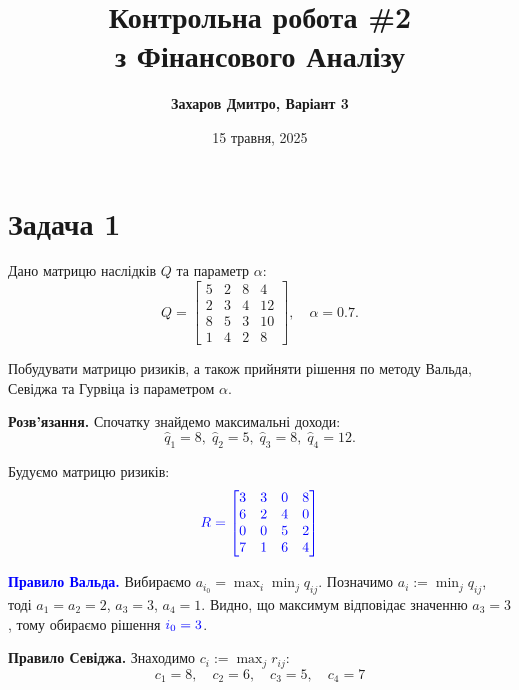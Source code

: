 \documentclass{test_template}
\title{\bfseries Контрольна робота \#2 \\з Фінансового Аналізу}
\author{\bfseries Захаров Дмитро, Варіант 3}
\date{15 травня, 2025}
\begin{document}
\pagestyle{fancy}

\maketitle

\section{Задача 1}

\begin{problem}
    Дано матрицю наслідків $Q$ та параметр $\alpha$:
    \begin{equation*}
        Q = \begin{bmatrix}
            5 & 2 & 8 & 4 \\
            2 & 3 & 4 & 12 \\ 
            8 & 5 & 3 & 10 \\
            1 & 4 & 2 & 8
        \end{bmatrix}, \quad \alpha=0.7.
    \end{equation*}

    Побудувати матрицю ризиків, а також прийняти рішення по методу Вальда,
    Севіджа та Гурвіца із параметром $\alpha$. 
\end{problem}

\textbf{Розв'язання.} Спочатку знайдемо максимальні доходи:
\begin{equation*}
    \hat{q}_1 = 8, \; \hat{q}_2 = 5, \; \hat{q}_3 = 8, \; \hat{q}_4 = 12.
\end{equation*}

Будуємо матрицю ризиків:
\begin{equation*}
    \textcolor{blue}{R = \begin{bmatrix}
        3 & 3 & 0 & 8 \\
        6 & 2 & 4 & 0 \\
        0 & 0 & 5 & 2 \\
        7 & 1 & 6 & 4
    \end{bmatrix}}
\end{equation*}

\textcolor{blue}{\textbf{Правило Вальда.}} Вибираємо $a_{i_0} = \max_i\min_j q_{ij}$. Позначимо
$a_i := \min_j q_{ij}$, тоді $a_1=a_2=2$, $a_3=3$, $a_4=1$. Видно, що максимум
відповідає значенню $a_3=3$, тому обираємо рішення $\textcolor{blue}{i_0=3}$.

\textcolor{green!60!black}{\textbf{Правило Севіджа.}} Знаходимо $c_i := \max_j r_{ij}$:
\begin{equation*}
    c_1 = 8, \quad c_2 = 6, \quad c_3 = 5, \quad c_4 = 7
\end{equation*}
\end{document}
